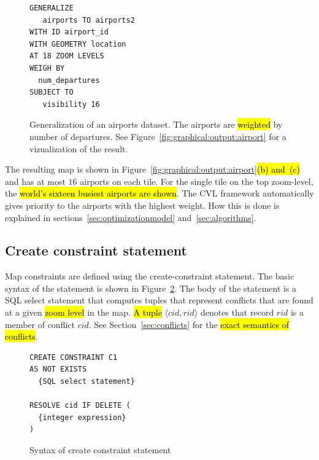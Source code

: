 \begin{figure}[h]
\begin{center}
\begin{lstlisting}
GENERALIZE 
   airports TO airports2
WITH ID airport_id
WITH GEOMETRY location
AT 18 ZOOM LEVELS
WEIGH BY
  num_departures
SUBJECT TO 
   visibility 16 
\end{lstlisting}
\caption{Generalization of an airports dataset. The airports are \hl{weighted} by number of departures. See Figure~\ref{fig:graphical:output:airport} for a vizualization of the result.}
\label{fig:cvl:example:airports}
\end{center}
\vspace*{-1ex}
\end{figure}



The resulting map is shown in Figure~\ref{fig:graphical:output:airport}\hl{(b) and~(c)} and has at most $16$ airports on each tile. For the single tile on the top zoom-level, the \hl{world's sixteen busiest airports are shown}. The CVL framework automatically gives priority to the airports with the highest weight. How this is done is explained in sections~\ref{sec:optimizationmodel} and~\ref{sec:algorithms}.

\subsection{Create constraint statement}
\label{sec:create:constraint:statement}

Map constraints are defined using the create-constraint statement.  The basic syntax of the statement is shown in Figure~\ref{fig:create:constraint:syntax}. The body of the statement is a SQL select statement that computes tuples that represent conflicts that are found at a given \hl{zoom level} in the map. \hl{A tuple }$\langle cid, rid\rangle$ denotes that record $rid$ is a member of conflict $cid$. See Section~\ref{sec:conflicts} for the \hl{exact semantics of conflicts}.

\begin{figure}[h]
\begin{center}
\begin{lstlisting}
CREATE CONSTRAINT C1
AS NOT EXISTS
  {SQL select statement}
  
RESOLVE cid IF DELETE (
  {integer expression}
)
\end{lstlisting}
\caption{Syntax of create constraint statement}
\label{fig:create:constraint:syntax}
\end{center}
\vspace*{-1ex}
\end{figure}


